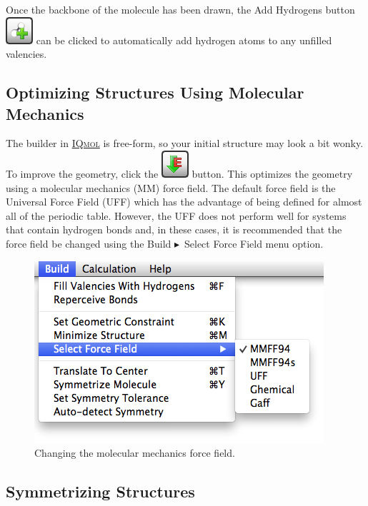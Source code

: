 \documentclass[a4paper,12pt]{article}
\newcommand{\iqmol}{\href{http://iqmol.org}{{\scshape IQmol}}}
\newcommand{\bt}{\ensuremath{\blacktriangleright}}
\begin{document}
Once the backbone of the molecule has been drawn, the Add Hydrogens button
\includegraphics[scale=0.40]{figures/AddHydrogensButton.png} can be clicked to
automatically add hydrogen atoms to any unfilled valencies.



\subsection{Optimizing Structures Using Molecular Mechanics}

The builder in \iqmol{} is free-form, so your initial structure may look a bit
wonky.  To improve the geometry, click the
\includegraphics[scale=0.40]{figures/MinimizeEnergyButton.png} button.  This
optimizes the geometry using a molecular mechanics (MM) force field.   The
default force field is the Universal Force Field (UFF)\cite{UFF} which has the
advantage of being defined for almost all of the periodic table.  However, the
UFF does not perform well for systems that contain hydrogen bonds and, in these
cases, it is recommended that the force field be changed using the Build \bt\
Select Force Field menu option.

\begin{figure}[h]
\begin{center}
\includegraphics[scale=0.5]{figures/ForceFieldMenu.png}
\caption{Changing the molecular mechanics force field.}
\end{center}
\end{figure}


\subsection{Symmetrizing Structures}
\end{document}
